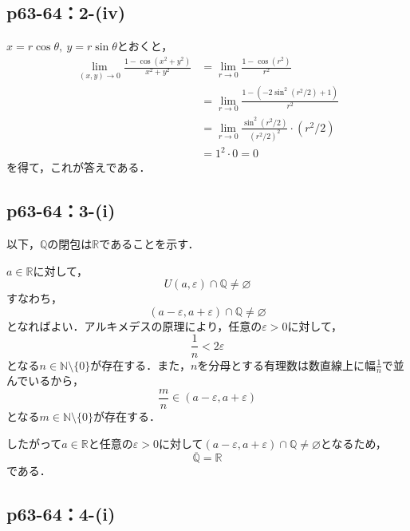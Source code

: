 \documentclass[a4paper,10pt,fleqn]{ltjsarticle}
\begin{document}
\subsection*{p63-64：2-(iv)}

\begin{tleftbar}
    $x=r \cos \theta,~y=r\sin \theta$とおくと，
    \begin{align*}
        \lim_{(x,y)\to 0} \frac{1-\cos (x^2+y^2)}{x^2+y^2} & = \lim_{r \to 0} \frac{1-\cos (r^2)}{r^2} \\
        & =\lim_{r \to 0} \frac{1-(-2\sin ^2 (r^2/2)+1)}{r^2} \\
        & =\lim_{r \to 0} \frac{\sin ^2 (r^2/2)}{(r^2/2)^2} \cdot (r^2/2) \\
        & = 1^2 \cdot 0 =0
    \end{align*}
    を得て，これが答えである．
\end{tleftbar}



\subsection*{p63-64：3-(i)}

\begin{tleftbar}
    以下，$\mathbb{Q}$の閉包は$\mathbb{R}$であることを示す．

    $a \in \mathbb{R}$に対して，
    \[
    U(a,\varepsilon) \cap \mathbb{Q} \ne \varnothing
    \]
    すなわち，
    \[
        (a-\varepsilon,a+\varepsilon) \cap \mathbb{Q} \ne \varnothing
    \]
    となればよい．アルキメデスの原理により，任意の$\varepsilon >0$に対して，
    \[
        \frac{1}{n}< 2\varepsilon 
    \]
    となる$n \in \mathbb{N} \setminus \{0\}$が存在する．また，$n$を分母とする有理数は数直線上に幅$\frac{1}{n}$で並んでいるから，
    \[
        \frac{m}{n} \in (a-\varepsilon,a+\varepsilon)
    \]
    となる$ m \in \mathbb{N} \setminus \{0\}$が存在する．\par 
    したがって$a \in \mathbb{R}$と任意の$\varepsilon>0$に対して$(a-\varepsilon,a+\varepsilon) \cap \mathbb{Q} \ne \varnothing$となるため，
    \[
        \overline{\mathbb{Q}}=\mathbb{R}
    \]
    である．
\end{tleftbar}

\subsection*{p63-64：4-(i)}
\end{document}

